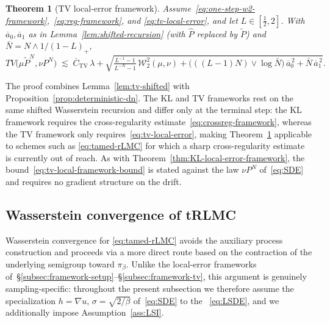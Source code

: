 \documentclass[11pt,a4paper,reqno]{amsart}
\theoremstyle{plain}
\newtheorem{theorem}{Theorem}
\theoremstyle{definition}
\theoremstyle{remark}
\newcommand{\W}{\mathcal{W}_2}
\begin{document}
\begin{theorem}[TV local-error framework]
\label{thm:tv-local-framework}
Assume~\eqref{eq:one-step-w2-framework},~\eqref{eq:reg-framework}, and
\eqref{eq:tv-local-error}, and let $L\in[\tfrac12,2]$. With
$\overline a_0,\overline a_1$ as in
Lemma~\ref{lem:shifted-recursion} (with $\widehat P$ replaced by
$\widetilde P$) and $\bar N=N\wedge 1/(1-L)_{+}$,
\begin{equation}\label{eq:tv-local-framework-bound}
  TV\!\bigl(\mu\widetilde P^{N},\nu P^{N}\bigr)
  \;\lesssim\;
  \overline C_{\mathrm{TV}}\,\lambda
  +\sqrt{
    \tfrac{L^{-1}-1}{L^{-N}-1}\,\W^{2}(\mu,\nu)
    +\bigl(((L-1)N)\vee\log\bar N\bigr)\,\overline a_0^{\,2}
    +\bar N\,\overline a_1^{\,2}
  }.
\end{equation}
\end{theorem}

The proof combines Lemma~\ref{lem:tv-shifted} with
Proposition~\ref{prop:deterministic-dn}. The KL and TV frameworks rest
on the same shifted Wasserstein recursion and differ only at the
terminal step: the KL framework requires the cross-regularity
estimate~\eqref{eq:crossreg-framework}, whereas the TV framework only
requires~\eqref{eq:tv-local-error}, making
Theorem~\ref{thm:tv-local-framework} applicable to schemes such as
\ref{eq:tamed-rLMC} for which a sharp cross-regularity estimate is currently
out of reach. As with Theorem~\ref{thm:KL-local-error-framework}, the bound~\eqref{eq:tv-local-framework-bound} is stated against the law $\nu P^N$ of~\eqref{eq:SDE} and requires no gradient structure on the drift.

\subsection{Wasserstein convergence of tRLMC}
\label{subsec:framework-W2}

Wasserstein convergence for \ref{eq:tamed-rLMC} avoids the auxiliary process
construction and proceeds via a more direct route based on the
contraction of the underlying semigroup toward $\pi_\beta$. Unlike the local-error frameworks of~\S\ref{subsec:framework-setup}--\S\ref{subsec:framework-tv}, this argument is genuinely sampling-specific: throughout the present subsection we therefore assume the specialization $h=\nabla u$, $\sigma=\sqrt{2/\beta}$ of~\eqref{eq:SDE} to the ~\eqref{eq:LSDE}, and we additionally impose Assumption~\ref{ass:LSI}.
\end{document}
